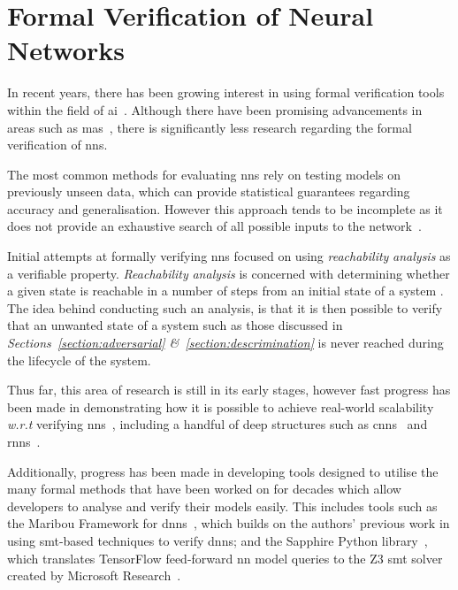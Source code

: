 \section{Formal Verification of Neural Networks}

In recent years, there has been growing interest in using formal verification tools
within the field of \gls{ai}~\citep{russell2016}. Although there have been promising advancements
in areas such as \gls{mas}~\citep{lomuscio2017, kouvaros2016}, there is significantly less research
regarding the formal verification of \glspl{nn}.

The most common methods for evaluating \glspl{nn} rely on testing models on 
previously unseen data, which can provide statistical guarantees regarding accuracy
and generalisation. However this approach tends to be incomplete as it does not provide an 
exhaustive search of all possible inputs to the network~\citep{akintunde2020}.

Initial attempts at formally verifying \glspl{nn} focused on using \textit{reachability }\textit{analysis }as 
a verifiable property. \textit{Reachability }\textit{analysis} is concerned with determining whether
a given state is reachable in a number of steps from an initial state of a system \citep{akintunde2018}.
The idea behind conducting such an analysis, is that it is then possible to verify
that an unwanted state of a system such as those discussed in \textit{Sections~\ref{section:adversarial} \&~\ref{section:descrimination}} 
is never reached during the lifecycle of the system.




Thus far, this area of research is still in its early stages, however fast progress has been made
in demonstrating how it is possible to achieve real-world scalability \textit{w.r.t }verifying \glspl{nn}~\citep{pulina2010, xiang2018}, including 
a handful of deep structures such as \glspl{cnn}~\citep{kouvaros2018} and \glspl{rnn}~\citep{zhang2020}.

Additionally, progress has been made in developing tools designed to utilise the many formal methods that
have been worked on for decades which allow developers to analyse and verify their models easily.
This includes tools such as the Maribou Framework for \glspl{dnn}~\citep{katz2019}, which builds on the 
authors' previous work in using \gls{smt}-based techniques to verify \glspl{dnn}; and
the Sapphire Python library~\citep{kokke2020}, which translates TensorFlow feed-forward \gls{nn} model queries to the Z3 \Gls{smt} solver created by Microsoft Research~\citep{demoura2008}.

